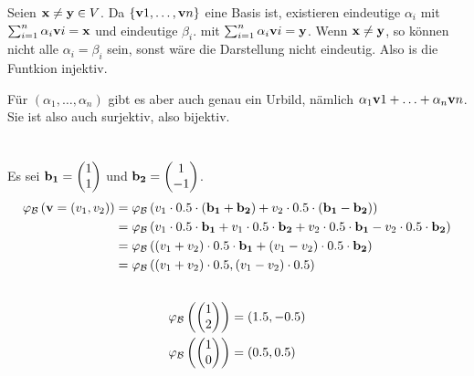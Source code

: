 \documentclass{../mfa}
\begin{document}
Seien $\mathbf{x} \neq \mathbf{y} \in V$.
Da $\{\mathbf{v}{1}, \ldots, \mathbf{v}{n}\}$ eine Basis ist, existieren eindeutige $\alpha_i$ mit $\sum_{i=1}^n \alpha_i \mathbf{v}{i} =
\mathbf{x}$ und eindeutige $\beta_i$. mit $\sum_{i=1}^n \alpha_i \mathbf{v}{i} =
\mathbf{y}$.
Wenn $\mathbf{x} \neq \mathbf{y}$, so können nicht alle $\alpha_i = \beta_i$ sein, sonst wäre die Darstellung nicht eindeutig.
Also is die Funtkion injektiv. 

Für $(\alpha_1,\ldots,\alpha_n)$ gibt es aber auch genau ein Urbild, nämlich $\alpha_1\mathbf{v}{1} + \ldots + \alpha_n\mathbf{v}{n}$.
Sie ist also auch surjektiv, also bijektiv.

\section{}

\subsection{}

\renewcommand{\b}[1]{\mbf{b_{#1}}}
Es sei $\b{1} = \inlinepmatrix{1 \\ 1}$ und $\b{2} = \inlinepmatrix{1 \\ -1}$.
\begin{align*}
   \myphi{\v{}=(v_1,v_2)} & = \myphi{v_1 \cdot 0.5 \cdot (\b{1} + \b{2}) + v_2 \cdot 0.5 \cdot (\b{1} - \b{2})} \\
                          & = \myphi{v_1 \cdot 0.5 \cdot \b{1} + v_1 \cdot 0.5 \cdot \b{2} + v_2 \cdot 0.5 \cdot \b{1} -
v_2 \cdot 0.5 \cdot \b{2}}  \\
                          & = \myphi{(v_1 + v_2) \cdot 0.5  \cdot \b{1} + (v_1 - v_2) \cdot 0.5 \cdot \b{2}}  \\
                          & = \myphi{(v_1 + v_2) \cdot 0.5, (v_1 - v_2) \cdot 0.5}  \\
\end{align*}

\subsection{}

\begin{align*}
   \varphi_\mathcal{B}\left(\begin{pmatrix}1 \\ 2\end{pmatrix}\right) &= (1.5, -0.5) \\
   \varphi_\mathcal{B}\left(\begin{pmatrix}1 \\ 0\end{pmatrix}\right) &= (0.5, 0.5)
\end{align*}
\end{document}
